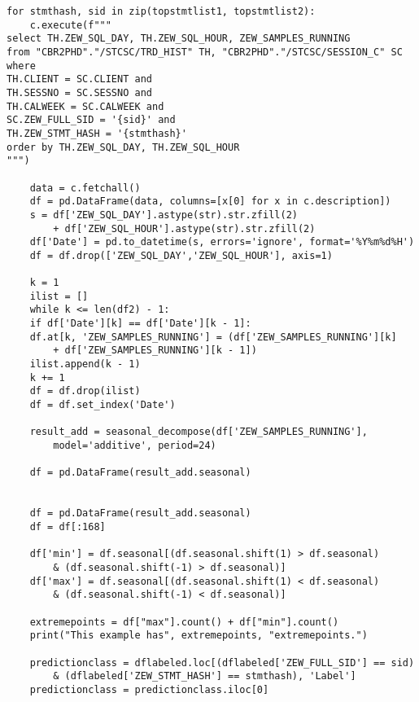 \begin{lstlisting}[caption={\texttt{Quelltext TSD-Klassifikation}},captionpos=b]
for stmthash, sid in zip(topstmtlist1, topstmtlist2):
	c.execute(f"""
select TH.ZEW_SQL_DAY, TH.ZEW_SQL_HOUR, ZEW_SAMPLES_RUNNING
from "CBR2PHD"."/STCSC/TRD_HIST" TH, "CBR2PHD"."/STCSC/SESSION_C" SC
where
TH.CLIENT = SC.CLIENT and
TH.SESSNO = SC.SESSNO and
TH.CALWEEK = SC.CALWEEK and
SC.ZEW_FULL_SID = '{sid}' and
TH.ZEW_STMT_HASH = '{stmthash}'
order by TH.ZEW_SQL_DAY, TH.ZEW_SQL_HOUR
""")

	data = c.fetchall()
	df = pd.DataFrame(data, columns=[x[0] for x in c.description])
	s = df['ZEW_SQL_DAY'].astype(str).str.zfill(2)
		+ df['ZEW_SQL_HOUR'].astype(str).str.zfill(2)
	df['Date'] = pd.to_datetime(s, errors='ignore', format='%Y%m%d%H')
	df = df.drop(['ZEW_SQL_DAY','ZEW_SQL_HOUR'], axis=1)
	
	k = 1
	ilist = []
	while k <= len(df2) - 1:
	if df['Date'][k] == df['Date'][k - 1]:
	df.at[k, 'ZEW_SAMPLES_RUNNING'] = (df['ZEW_SAMPLES_RUNNING'][k] 
		+ df['ZEW_SAMPLES_RUNNING'][k - 1])
	ilist.append(k - 1)
	k += 1
	df = df.drop(ilist)
	df = df.set_index('Date')
	
	result_add = seasonal_decompose(df['ZEW_SAMPLES_RUNNING'], 
		model='additive', period=24)
	
	df = pd.DataFrame(result_add.seasonal)
	
	
	df = pd.DataFrame(result_add.seasonal)
	df = df[:168]
	
	df['min'] = df.seasonal[(df.seasonal.shift(1) > df.seasonal) 
		& (df.seasonal.shift(-1) > df.seasonal)]
	df['max'] = df.seasonal[(df.seasonal.shift(1) < df.seasonal) 
		& (df.seasonal.shift(-1) < df.seasonal)]
	
	extremepoints = df["max"].count() + df["min"].count()
	print("This example has", extremepoints, "extremepoints.")
	
	predictionclass = dflabeled.loc[(dflabeled['ZEW_FULL_SID'] == sid) 
		& (dflabeled['ZEW_STMT_HASH'] == stmthash), 'Label']
	predictionclass = predictionclass.iloc[0]
	

\end{lstlisting}
